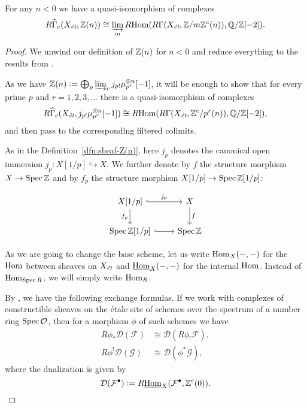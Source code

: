 \documentclass{article}
\numberwithin{equation}{section}
\begin{document}
\begin{proposition}
  For any $n < 0$ we have a quasi-isomorphism of complexes
  \begin{equation}
    \label{eqn:duality-quasi-isomorphism-1}
    R\widehat{\Gamma}_c (X_\et, \ZZ (n)) \cong
    \varinjlim_m \RHom (R\Gamma (X_\et, \ZZ/m\ZZ^c (n)), \QQ/\ZZ [-2]).
  \end{equation}

  \begin{proof}
    We unwind our definition of $\ZZ (n)$ for $n < 0$ and reduce everything to
    the results from \cite{Geisser-2010}.

    \vspace{1em}

    As we have
    $\ZZ (n) \dfn \bigoplus_p \varinjlim_r j_{p!} \mu_{p^r}^{\otimes n} [-1]$,
    it will be enough to show that for every prime $p$ and $r=1,2,3,\ldots$
    there is a quasi-isomorphism of complexes
    \[ R\widehat{\Gamma}_c (X_\et, j_{p!} \mu_{p^r}^{\otimes n} [-1]) \cong
    \RHom (R\Gamma (X_\et, \ZZ^c/p^r (n)), \QQ/\ZZ [-2]), \]
    and then pass to the corresponding filtered colimits.

    As in the Definition~\ref{dfn:sheaf-Z(n)}, here $j_p$ denotes the canonical
    open immersion $j_p\colon X[1/p] \hookrightarrow X$. We further denote by
    $f$ the structure morphism $X\to \Spec \ZZ$ and by $f_p$ the structure
    morphism $X [1/p] \to \Spec \ZZ [1/p]$:

    \[ \begin{tikzcd}
      X [1/p]\ar[hookrightarrow]{r}{j_p}\ar{d}[swap]{f_p} & X\ar{d}{f} \\
      \Spec \ZZ [1/p]\ar[hookrightarrow]{r} & \Spec \ZZ
    \end{tikzcd} \]

    As we are going to change the base scheme, let us write $\Hom_X (-,-)$ for
    the $\Hom$ between sheaves on $X_\et$ and $\iHom_X (-,-)$ for the
    internal $\Hom$. Instead of $\Hom_{\Spec R}$, we will simply write
    $\Hom_R$.

    By \cite[Proposition~7.10~(c)]{Geisser-2010}, we have the following
    exchange formulas. If we work with complexes of constructible sheaves on the
    étale site of schemes over the spectrum of a number ring
    $\Spec\mathcal{O}$, then for a morphism $\phi$ of such schemes we have
    \begin{align}
      \label{eqn:exchange-formula-1} R \phi_* \mathcal{D} (\mathcal{F}) & \cong \mathcal{D} (R \phi_! \mathcal{F}),\\
      \label{eqn:exchange-formula-2} R \phi^! \mathcal{D} (\mathcal{G}) & \cong \mathcal{D} (\phi^* \mathcal{G}),
    \end{align}
    where the dualization is given by
    \[ \mathcal{D} (\mathcal{F}^\bullet) \dfn
    R\iHom_X (\mathcal{F}^\bullet, \ZZ^c (0)). \]


\end{proof}
\end{proposition}
\end{document}

